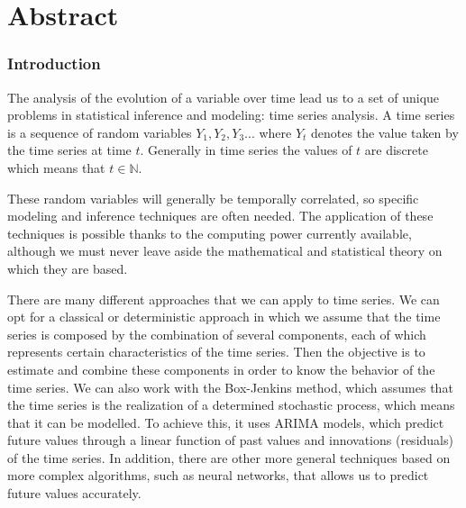 \documentclass[12pt,a4paper,oneside]{article}
\begin{document}
\newenvironment{itemize*}
        {\begin{itemize}
            \setlength{\itemsep}{1pt}
            \setlength{\parsep}{3pt}
            \setlength{\parskip}{3pt}}
        {\end{itemize}}

\newenvironment{enumerate*}
        {\begin{enumerate}
            \setlength{\itemsep}{1pt}
            \setlength{\parsep}{3pt}
            \setlength{\parskip}{3pt}}
        {\end{enumerate}}


\part*{Abstract}

\section*{Introduction}
The analysis of the evolution of a variable over time lead us to a set of unique problems in statistical inference and modeling: time series analysis. A time series is a sequence of random variables $Y_1,Y_2,Y_3...$  where $Y_t$ denotes the value taken by the time series at time $t$. Generally in time series the values of $t$ are discrete which means that $t \in \mathbb{N}$.

These random variables will generally be temporally correlated, so specific modeling and inference techniques are often needed. The application of these techniques is possible thanks to the computing power currently available, although we must never leave aside the mathematical and statistical theory on which they are based.

There are many different approaches that we can apply to time series. We can opt for a classical or deterministic approach in which we assume that the time series is composed by the combination of several components, each of which represents certain characteristics of the time series. Then the objective is to estimate and combine these components in order to know the behavior of the time series. We can also work with the Box-Jenkins method, which assumes that the time series is the realization of a determined stochastic process, which means that it can be modelled. To achieve this, it uses ARIMA models, which predict future values through a linear function of past values and innovations (residuals) of the time series. In addition, there are other more general techniques based on more complex algorithms, such as neural networks, that allows us to predict future values accurately.
\end{document}

